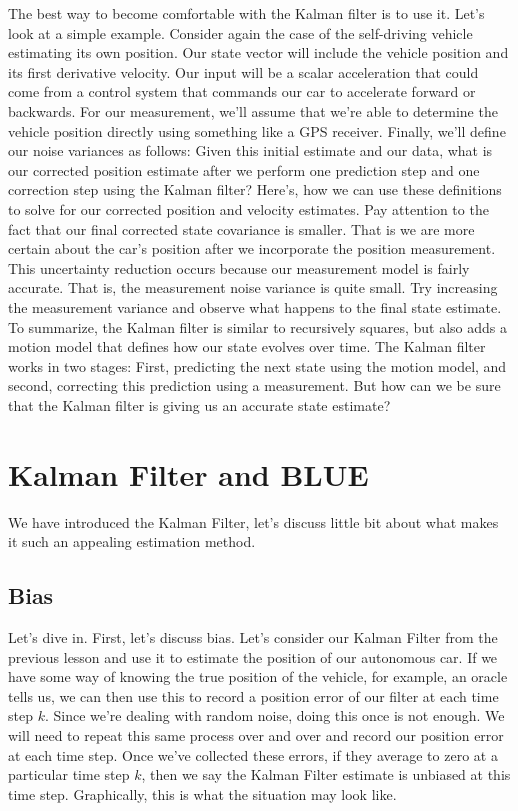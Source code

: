 The best way to become comfortable with the
Kalman filter is to use it. Let's look at a simple example. Consider again the case of the self-driving vehicle
estimating its own position. Our state vector will include the vehicle position and
its first derivative velocity. Our input will be a scalar acceleration
that could come from a control system that commands our car
to accelerate forward or backwards. For our measurement, we'll assume
that we're able to determine the vehicle position directly using
something like a GPS receiver. Finally, we'll define
our noise variances as follows: Given this initial
estimate and our data, what is our corrected position
estimate after we perform one prediction step and one correction
step using the Kalman filter? Here's, how we can use
these definitions to solve for our corrected position
and velocity estimates. Pay attention to the fact that our final corrected state
covariance is smaller. That is we are more certain about the car's position after we
incorporate the position measurement. This uncertainty reduction occurs because our measurement model
is fairly accurate. That is, the measurement noise
variance is quite small. Try increasing
the measurement variance and observe what happens to
the final state estimate. To summarize, the Kalman filter is
similar to recursively squares, but also adds a motion model that
defines how our state evolves over time. The Kalman filter works
in two stages: First, predicting the next state
using the motion model, and second, correcting
this prediction using a measurement. But how can we be sure
that the Kalman filter is giving us an accurate state estimate? 


\section{Kalman Filter and BLUE}
\label{kalman_filter_blue}

We have introduced the Kalman Filter, let's discuss little bit about what makes
it such an appealing estimation method. 

\subsection{Bias}
\label{kalman_filter_bias}

Let's dive in. First, let's discuss bias. Let's consider our Kalman Filter
from the previous lesson and use it to estimate the position
of our autonomous car. If we have some way of knowing the true
position of the vehicle, for example, an oracle tells us, we can then use this to record a position
error of our filter at each time step $k$. Since we're dealing with random noise,
doing this once is not enough. We will need to repeat this same
process over and over and record our position
error at each time step. Once we've collected these errors, if they
average to zero at a particular time step $k$, then we say the Kalman Filter
estimate is unbiased at this time step.  Graphically, this is what the situation may look like. 

